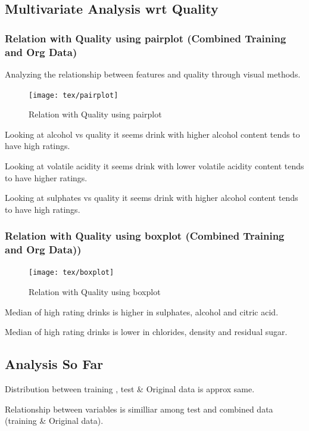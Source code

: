 \subsection{Multivariate Analysis wrt Quality}\phantom{...}

\subsubsection{Relation with Quality using pairplot (Combined Training and Org Data)}\phantom{...}

Analyzing the relationship between features and quality through visual methods.

\begin{figure}[H]
	\centering
	\texttt{[image: tex/pairplot]}
	\caption{Relation with Quality using pairplot}
	\label{fig:pairplot}
\end{figure}

Looking at alcohol vs quality it seems drink with higher alcohol content tends to have high ratings.

Looking at volatile acidity it seems drink with lower volatile acidity content tends to have higher ratings.

Looking at sulphates vs quality it seems drink with higher alcohol content tends to have high ratings.

\subsubsection{Relation with Quality using boxplot (Combined Training and Org Data))}\phantom{...}

\begin{figure}[H]
	\centering
	\texttt{[image: tex/boxplot]}
	\caption{Relation with Quality using boxplot}
	\label{fig:boxplot}
\end{figure}

Median of high rating drinks is higher in sulphates, alcohol and citric acid.

Median of high rating drinks is lower in chlorides, density and residual sugar.

\subsection{Analysis So Far}\phantom{...}

Distribution between training , test \& Original data is approx same.

Relationship between variables is similliar among test and combined data (training \& Original data).

